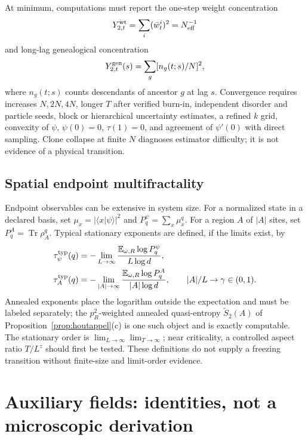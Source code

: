 \documentclass[aps,prx,reprint,superscriptaddress,nobibnotes,longbibliography]{revtex4-2}
\theoremstyle{remark}
\newcommand{\Tr}{\operatorname{Tr}}
\newcommand{\E}{\mathbb E}
\begin{document}
At minimum, computations must report the one-step weight concentration
\begin{equation}
 Y_{2,t}^{\rm wt}=\sum_i(\bar w_t^i)^2=N_{\rm eff}^{-1}
\end{equation}
and long-lag genealogical concentration
\begin{equation}
 Y_{2,t}^{\rm gen}(s)=\sum_g[n_g(t;s)/N]^2,
\end{equation}
where $n_g(t;s)$ counts descendants of ancestor $g$ at lag $s$.  Convergence requires increases $N,2N,4N$, longer $T$ after verified burn-in, independent disorder and particle seeds, block or hierarchical uncertainty estimates, a refined $k$ grid, convexity of $\psi$, $\psi(0)=0$, $\tau(1)=0$, and agreement of $\psi'(0)$ with direct sampling.  Clone collapse at finite $N$ diagnoses estimator difficulty; it is not evidence of a physical transition.

\subsection{Spatial endpoint multifractality}

Endpoint observables can be extensive in system size.  For a normalized state in a declared basis, set $\mu_x=|\langle x|\psi\rangle|^2$ and $P_q^\psi=\sum_x\mu_x^q$.  For a region $A$ of $|A|$ sites, set $P_q^A=\Tr\rho_A^q$.  Typical stationary exponents are defined, if the limits exist, by
\begin{align}
 \tau_\psi^{\rm typ}(q)&=-\lim_{L\to\infty}\frac{\E_{\omega,R}\log P_q^\psi}{L\log d},\\
 \tau_A^{\rm typ}(q)&=-\lim_{|A|\to\infty}\frac{\E_{\omega,R}\log P_q^A}{|A|\log d},\qquad |A|/L\to\gamma\in(0,1).
\end{align}
Annealed exponents place the logarithm outside the expectation and must be labeled separately; the $p_R^2$-weighted annealed quasi-entropy $\tilde S_2(A)$ of Proposition~\ref{prop:houtappel}(c) is one such object and is exactly computable.  The stationary order is $\lim_{L\to\infty}\lim_{T\to\infty}$; near criticality, a controlled aspect ratio $T/L^z$ should first be tested.  These definitions do not supply a freezing transition without finite-size and limit-order evidence.

\section{Auxiliary fields: identities, not a microscopic derivation}
\end{document}
